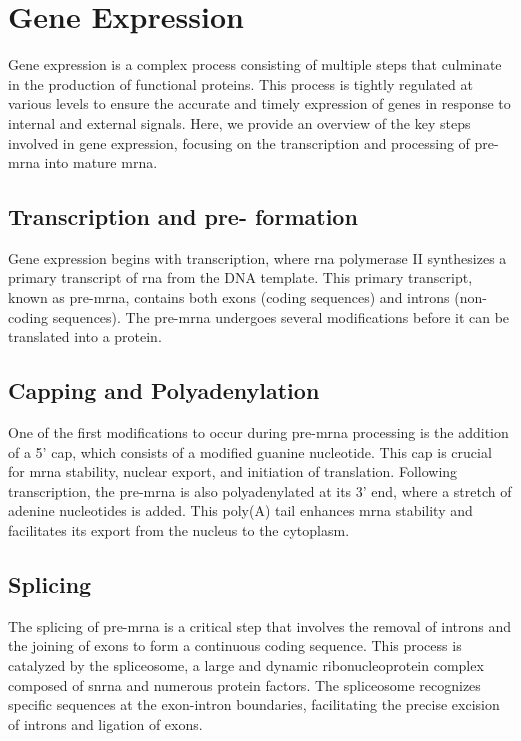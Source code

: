 \section{Gene Expression}
\label{sec:gene_expression}

Gene expression is a complex process consisting of multiple steps that
culminate in the production of functional proteins.
This process is tightly regulated at various levels to ensure the accurate and
timely expression of genes in response to internal and external signals.
Here, we provide an overview of the key steps involved in gene expression,
focusing on the transcription and processing of pre-\gls{mrna} into mature
\gls{mrna}.

\subsection{Transcription and pre- formation}
Gene expression begins with transcription, where \gls{rna} polymerase II
synthesizes a primary transcript of \gls{rna} from the DNA template.
This primary transcript, known as pre-\gls{mrna}, contains both exons (coding
sequences) and introns (non-coding sequences)\supercite{lee_mechanisms_2015}.
The pre-\gls{mrna} undergoes several modifications before it can be translated
into a protein.

\subsection{Capping and Polyadenylation}
One of the first modifications to occur during pre-\gls{mrna} processing is the
addition of a 5' cap, which consists of a modified guanine nucleotide.
This cap is crucial for \gls{mrna} stability, nuclear export, and initiation of
translation\supercite{topisirovic_cap_2011}.
Following transcription, the pre-\gls{mrna} is also polyadenylated at its 3'
end, where a stretch of adenine nucleotides is added.
This poly(A) tail enhances \gls{mrna} stability and facilitates its export from
the nucleus to the cytoplasm\supercite{passmore_roles_2022}.

\subsection{Splicing}
The splicing of pre-\gls{mrna} is a critical step that involves the removal of
introns and the joining of exons to form a continuous coding sequence.
This process is catalyzed by the spliceosome, a large and dynamic
ribonucleoprotein complex composed of \gls{snrna} and numerous protein
factors\supercite{lee_mechanisms_2015}.
The spliceosome recognizes specific sequences at the exon-intron boundaries,
facilitating the precise excision of introns and ligation of
exons\supercite{wang_splicing_2008}.

